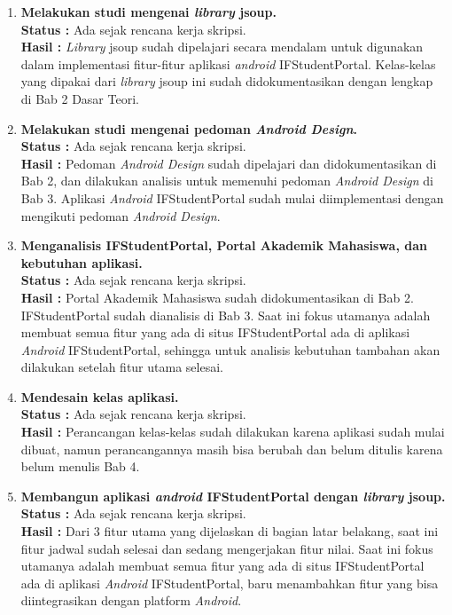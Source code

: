 \documentclass[a4paper,twoside]{article}
\begin{document}
	\begin{enumerate}
		\item \textbf{Melakukan studi mengenai \textit{library} jsoup.}\\
		{\bf Status :} Ada sejak rencana kerja skripsi.\\
		{\bf Hasil :} \textit{Library} jsoup sudah dipelajari secara mendalam untuk digunakan dalam implementasi fitur-fitur aplikasi \textit{android} IFStudentPortal. Kelas-kelas yang dipakai dari \textit{library} jsoup ini sudah didokumentasikan dengan lengkap di Bab 2 Dasar Teori.
		
		\item \textbf{Melakukan studi mengenai pedoman \textit{Android Design}.}\\
		{\bf Status :} Ada sejak rencana kerja skripsi.\\
		{\bf Hasil :} Pedoman \textit{Android Design} sudah dipelajari dan didokumentasikan di Bab 2, dan dilakukan analisis untuk memenuhi pedoman \textit{Android Design} di Bab 3. Aplikasi \textit{Android} IFStudentPortal sudah mulai diimplementasi dengan mengikuti pedoman \textit{Android Design}. 

		\item \textbf{Menganalisis IFStudentPortal, Portal Akademik Mahasiswa, dan kebutuhan aplikasi.}\\
		{\bf Status :} Ada sejak rencana kerja skripsi.\\
		{\bf Hasil :} Portal Akademik Mahasiswa sudah didokumentasikan di Bab 2. IFStudentPortal sudah dianalisis di Bab 3. Saat ini fokus utamanya adalah membuat semua fitur yang ada di situs IFStudentPortal ada di aplikasi \textit{Android} IFStudentPortal, sehingga untuk analisis kebutuhan tambahan akan dilakukan setelah fitur utama selesai.

		\item \textbf{Mendesain kelas aplikasi.}\\
		{\bf Status :} Ada sejak rencana kerja skripsi.\\
		{\bf Hasil :} Perancangan kelas-kelas sudah dilakukan karena aplikasi sudah mulai dibuat, namun perancangannya masih bisa berubah dan belum ditulis karena belum menulis Bab 4.

		\item \textbf{Membangun aplikasi \textit{android} IFStudentPortal dengan \textit{library} jsoup.}\\
		{\bf Status :} Ada sejak rencana kerja skripsi.\\
		{\bf Hasil :} Dari 3 fitur utama yang dijelaskan di bagian latar belakang, saat ini fitur jadwal sudah selesai dan sedang mengerjakan fitur nilai. Saat ini fokus utamanya adalah membuat semua fitur yang ada di situs IFStudentPortal ada di aplikasi \textit{Android} IFStudentPortal, baru menambahkan fitur yang bisa diintegrasikan dengan platform \textit{Android}.


\end{enumerate}
\end{document}
